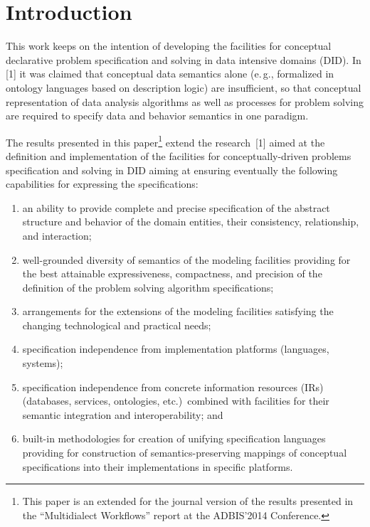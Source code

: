 




      \thispagestyle{myheadings}

      \begin{multicols}{2}

                  \label{st\stat}

\section{Introduction}

  \noindent
  This work keeps on the intention of developing the facilities for conceptual
declarative problem specification and solving in data intensive domains (DID). In [1]
it was claimed that conceptual data semantics alone (e.\,g., formalized in ontology
languages based on description logic) are insufficient, so that conceptual
representation of data analysis algorithms as well as processes for problem solving are
required to specify data and behavior semantics in one paradigm.

The results presented in this paper\footnote[3]{This paper is an extended for the journal version of
the results presented in the ``Multidialect Workflows'' report at the ADBIS'2014
Conference.} extend the research~[1] aimed at the definition and implementation of the
facilities for conceptually-driven problems specification and solving in DID aiming at
ensuring eventually the following capabilities for expressing the specifications:
\begin{enumerate}[(1)]
\item an ability to provide complete and precise specification of the abstract
structure and behavior of the domain entities, their consistency, relationship, and
interaction;
\item well-grounded diversity of semantics of the modeling facilities providing for
the best attainable expressiveness, compactness, and precision of the definition of
the problem solving algorithm specifications;
\item arrangements for the extensions of the modeling facilities satisfying the
changing technological and practical needs;
\item specification independence from implementation platforms (languages,
systems);
\item specification independence from concrete information resources (IRs)
(databases,
services, ontologies, etc.)\ combined with facilities for their semantic
integration and interoperability; and
\item built-in methodologies for creation of unifying specification languages
providing for construction of semantics-preserving mappings of conceptual
specifications into their implementations in specific platforms.
\end{enumerate}


\end{multicols}
